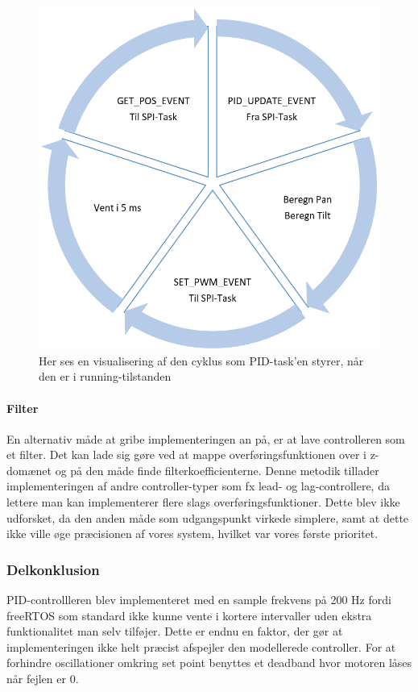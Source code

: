 \begin{figure}[ht]
	\begin{center}
	\includegraphics[scale=0.5]{Billeder/PID_update.png}
	\end{center}		
	\caption{Her ses en visualisering af den cyklus som PID-task'en styrer, når den er i running-tilstanden}
	\label{fig:PID_update}
\end{figure}

\paragraph{Filter}
En alternativ måde at gribe implementeringen an på, er at lave controlleren som et filter. Det kan lade sig gøre ved at mappe overføringsfunktionen over i z-domænet og på den måde finde filterkoefficienterne. Denne metodik tillader implementeringen af andre controller-typer som fx lead- og lag-controllere, da lettere man kan implementerer flere slags overføringsfunktioner. Dette blev ikke udforsket, da den anden måde som udgangspunkt virkede simplere, samt at dette ikke ville øge præcisionen af vores system, hvilket var vores første prioritet.

\subsubsection{Delkonklusion}
PID-controllleren blev implementeret med en sample frekvens på 200 Hz fordi freeRTOS som standard ikke kunne vente i kortere intervaller uden ekstra funktionalitet man selv tilføjer. Dette er endnu en faktor, der gør at implementeringen ikke helt præcist  afspejler den modellerede controller. For at forhindre oscillationer omkring set point benyttes et deadband hvor motoren låses når fejlen er 0. 

